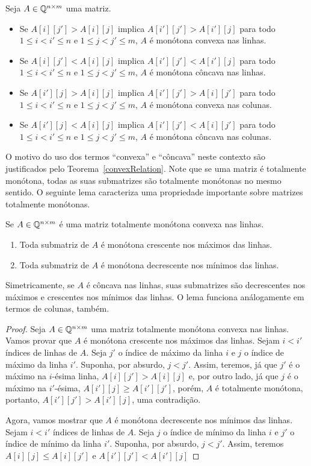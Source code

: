 \begin{defi}
Seja $A \in \mathbb{Q}^{n \times m}$ uma matriz.
    \begin{itemize}
        \item Se $A[i][j'] > A[i][j]$ implica $A[i'][j'] > A[i'][j]$ para todo $1 \leq i < i' \leq n$ e $1 \leq j < j' \leq m$, $A$ é monótona convexa nas linhas.
        \item Se $A[i][j'] < A[i][j]$ implica $A[i'][j'] < A[i'][j]$ para todo $1 \leq i < i' \leq n$ e $1 \leq j < j' \leq m$, $A$ é monótona côncava nas linhas.
        \item Se $A[i'][j] > A[i][j]$ implica $A[i'][j'] > A[i][j']$ para todo $1 \leq i < i' \leq n$ e $1 \leq j < j' \leq m$, $A$ é monótona convexa nas colunas.
        \item Se $A[i'][j] < A[i][j]$ implica $A[i'][j'] < A[i][j']$ para todo $1 \leq i < i' \leq n$ e $1 \leq j < j' \leq m$, $A$ é monótona côncava nas colunas.
    \end{itemize}
\end{defi}

O motivo do uso dos termos ``convexa'' e ``côncava'' neste contexto são justificados pelo Teorema~\ref{convexRelation}. Note que se uma matriz é totalmente monótona, todas as suas submatrizes são totalmente monótonas no mesmo sentido. O seguinte lema caracteriza uma propriedade importante sobre matrizes totalmente monótonas.  

\begin{lema}
Se $A \in \mathbb{Q}^{n \times m}$ é uma matriz totalmente monótona convexa nas linhas.
    \begin{enumerate}
        \item Toda submatriz de $A$ é monótona crescente nos máximos das linhas.
        \item Toda submatriz de $A$ é monótona decrescente nos mínimos das linhas.
    \end{enumerate}

Simetricamente, se $A$ é côncava nas linhas, suas submatrizes são decrescentes nos máximos e crescentes nos mínimos das linhas. O lema funciona análogamente em termos de colunas, também.  
\end{lema}

\begin{proof}
Seja $A \in \mathbb{Q}^{n \times m}$ uma matriz totalmente monótona convexa nas linhas. Vamos provar que $A$ é monótona crescente nos máximos das linhas. Sejam $i < i'$ índices de linhas de $A$. Seja $j'$ o índice de máximo da linha $i$ e $j$ o índice de máximo da linha $i'$. Suponha, por absurdo, $j < j'$. Assim, teremos, já que $j'$ é o máximo na $i$-ésima linha, $A[i][j'] > A[i][j]$ e, por outro lado, já que $j$ é o máximo na $i'$-ésima, $A[i'][j] \geq A[i'][j']$, porém, $A$ é totalmente monótona, portanto, $A[i'][j'] > A[i'][j]$, uma contradição.  

Agora, vamos mostrar que $A$ é monótona decrescente nos mínimos das linhas. Sejam $i < i'$ índices de linhas de $A$. Seja $j$ o índice de mínimo da linha $i$ e $j'$ o índice de mínimo da linha $i'$. Suponha, por absurdo, $j < j'$. Assim, teremos $A[i][j] \leq A[i][j']$ e $A[i'][j'] < A[i'][j]$
\end{proof}
